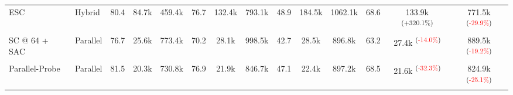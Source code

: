 \begin{table}[t]
\begin{adjustbox}{width=\textwidth}
\begin{tabular}{l l ccc ccc ccc ccc}
ESC & Hybrid & 80.4 & 84.7k & 459.4k & 76.7 & 132.4k & 793.1k & 48.9 & 184.5k & 1062.1k & 68.6 & 133.9k \textsuperscript{\scriptsize(\textcolor{green!80!black}{+320.1\%})} & 771.5k \textsuperscript{\scriptsize(\textcolor{red}{-29.9\%})} \\
SC @ 64 + SAC & Parallel & 76.7 & 25.6k & 773.4k & 70.2 & 28.1k & 998.5k & 42.7 & 28.5k & 896.8k & 63.2 & 27.4k \textsuperscript{\scriptsize(\textcolor{red}{-14.0\%})} & 889.5k \textsuperscript{\scriptsize(\textcolor{red}{-19.2\%})} \\
Parallel-Probe & Parallel & 81.5 & 20.3k & 730.8k & 76.9 & 21.9k & 846.7k & 47.1 & 22.4k & 897.2k & 68.5 & 21.6k \textsuperscript{\scriptsize(\textcolor{red}{-32.3\%})} & 824.9k \textsuperscript{\scriptsize(\textcolor{red}{-25.1\%})} \\
\bottomrule \end{tabular} \end{adjustbox} \end{table}